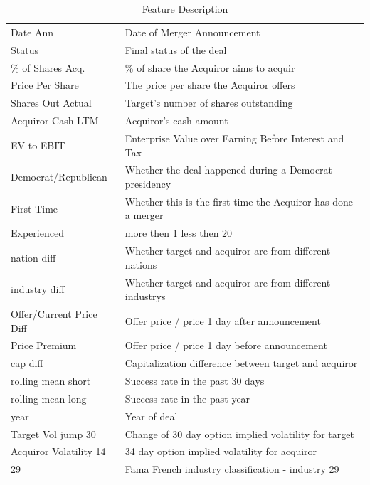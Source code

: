 \documentclass[12pt]{article}
\begin{document}
\begin{table}[h]
\caption{Feature Description}
\begin{tabular}{ll}
Date Ann                 & Date of Merger Announcement                                  \\
Status                   & Final status of the deal                                     \\
\% of Shares Acq.        & \% of share the Acquiror aims to acquir                      \\
Price Per Share          & The price per share the Acquiror offers                      \\
Shares Out Actual        & Target's number of shares outstanding                        \\
Acquiror Cash LTM        & Acquiror's cash amount                                       \\
EV to EBIT               & Enterprise Value over Earning Before Interest and Tax        \\
Democrat/Republican      & Whether the deal happened during a Democrat presidency       \\
First Time               & Whether this is the first time the Acquiror has done a merger \\
Experienced              & more then 1 less then 20                            \\
nation diff              & Whether target and acquiror are from different nations       \\
industry diff            & Whether target and acquiror are from different industrys     \\
Offer/Current Price Diff & Offer price / price 1 day after announcement                 \\
Price Premium            & Offer price / price 1 day before announcement                \\
cap diff                & Capitalization difference between target and acquiror       \\
rolling mean short               & Success rate in the past 30 days  \\
rolling mean long              & Success rate in the past year                            \\
year              & Year of deal       \\
Target Vol jump 30         & Change of 30 day option implied volatility for target     \\
Acquiror Volatility 14 & 34 day option implied volatility for acquiror              \\
29          & Fama French industry classification - industry 29            
\end{tabular}


\end{table}
\end{document}
